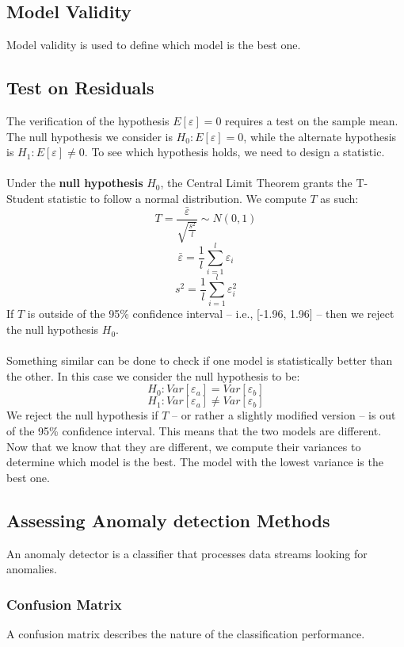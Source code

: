 \documentclass{article}
\begin{document}
\subsection{Model Validity}
Model validity is used to define which model is the best one.

\subsection{Test on Residuals}
The verification of the hypothesis $E[\varepsilon] = 0$ requires a test on the sample mean. The null hypothesis we consider is $H_0 : E[\varepsilon] = 0$, while the alternate hypothesis is $H_1 : E[\varepsilon] \not = 0$. To see which hypothesis holds, we need to design a statistic. \\ \\
Under the \textbf{null hypothesis} $H_0$, the Central Limit Theorem grants the T-Student statistic to follow a normal distribution. We compute $T$ as such:
\[ T = \frac{\bar \varepsilon}{\sqrt{\frac{s^2}{l}}} \sim N(0,1) \]
\[ \bar\varepsilon = \frac{1}{l} \sum^l_{i = 1} \varepsilon_i \]
\[ s^2 = \frac{1}{l} \sum^l_{i = 1} \varepsilon^2_i \]
If $T$ is outside of the 95\% confidence interval -- i.e., [-1.96, 1.96] -- then we reject the null hypothesis $H_0$. \\ \\
Something similar can be done to check if one model is statistically better than the other. In this case we consider the null hypothesis to be:
\[ H_0 : Var[\varepsilon_a] = Var[\varepsilon_b] \]
\[ H_1 : Var[\varepsilon_a] \not = Var[\varepsilon_b] \]
We reject the null hypothesis if $T$ -- or rather a slightly modified version -- is out of the 95\% confidence interval. This means that the two models are different. Now that we know that they are different, we compute their variances to determine which model is the best. The model with the lowest variance is the best one.

\subsection{Assessing Anomaly detection Methods}
An anomaly detector is a classifier that processes data streams looking for anomalies.

\subsubsection{Confusion Matrix}
A confusion matrix describes the nature of the classification performance.
\end{document}

